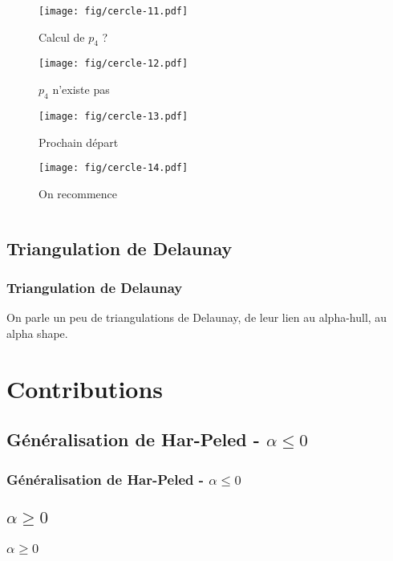 \documentclass{beamer}
\begin{document}
\begin{frame}
\begin{columns}[t]
\begin{column}{6cm}
{\begin{figure}[h!]
    \texttt{[image: fig/cercle-11.pdf]}
    \caption{Calcul de $p_{4}$ ?}
\end{figure}
}
{
  \begin{figure}[h!]
    \centering
    \texttt{[image: fig/cercle-12.pdf]}
    \caption{$p_{4}$ n'existe pas}
\end{figure}
}
{
  \begin{figure}[h!]
    \centering
    \texttt{[image: fig/cercle-13.pdf]}
    \caption{Prochain départ}
\end{figure}
}
{
  \begin{figure}[h!]
    \centering
    \texttt{[image: fig/cercle-14.pdf]}
    \caption{On recommence}
\end{figure}
}



  \end{column}
\end{columns} 

\end{frame}
    
\subsection{Triangulation de Delaunay}  %
\begin{frame}
\frametitle{Triangulation de Delaunay}
On parle un peu de triangulations de Delaunay, de leur lien au alpha-hull, au alpha shape.
\end{frame}

\section{Contributions}

\subsection{Généralisation de Har-Peled - $\alpha \leq 0$}
\begin{frame}
\frametitle{Généralisation de Har-Peled - $\alpha \leq 0$}

\end{frame}

\subsection{$\alpha \geq 0$}
\begin{frame}
\frametitle{$\alpha \geq 0$}
\end{frame}
\end{document}
